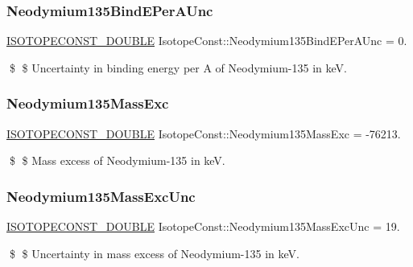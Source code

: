 \subsubsection{\texorpdfstring{Neodymium135\+Bind\+E\+Per\+A\+Unc}{Neodymium135BindEPerAUnc}}
{\footnotesize\ttfamily \mbox{\hyperlink{group___isotope_const-_macros_ga8f45a7272ce02c0b4c65c44636ed719a}{I\+S\+O\+T\+O\+P\+E\+C\+O\+N\+S\+T\+\_\+\+D\+O\+U\+B\+LE}} Isotope\+Const\+::\+Neodymium135\+Bind\+E\+Per\+A\+Unc = 0.}

\$ \$ Uncertainty in binding energy per A of Neodymium-\/135 in keV. \mbox{\label{group___isotope_const-_neodymium-_nd135_gab57612b5b94f514c580dae2fa6f1209b}} 
\subsubsection{\texorpdfstring{Neodymium135\+Mass\+Exc}{Neodymium135MassExc}}
{\footnotesize\ttfamily \mbox{\hyperlink{group___isotope_const-_macros_ga8f45a7272ce02c0b4c65c44636ed719a}{I\+S\+O\+T\+O\+P\+E\+C\+O\+N\+S\+T\+\_\+\+D\+O\+U\+B\+LE}} Isotope\+Const\+::\+Neodymium135\+Mass\+Exc = -\/76213.}

\$ \$ Mass excess of Neodymium-\/135 in keV. \mbox{\label{group___isotope_const-_neodymium-_nd135_ga04783888f1914cb6372079a59f0deef4}} 
\subsubsection{\texorpdfstring{Neodymium135\+Mass\+Exc\+Unc}{Neodymium135MassExcUnc}}
{\footnotesize\ttfamily \mbox{\hyperlink{group___isotope_const-_macros_ga8f45a7272ce02c0b4c65c44636ed719a}{I\+S\+O\+T\+O\+P\+E\+C\+O\+N\+S\+T\+\_\+\+D\+O\+U\+B\+LE}} Isotope\+Const\+::\+Neodymium135\+Mass\+Exc\+Unc = 19.}

\$ \$ Uncertainty in mass excess of Neodymium-\/135 in keV. \mbox{\label{group___isotope_const-_neodymium-_nd135_gae0a1a0e56bddeeaa3e1382dcb39e3be4}} 
